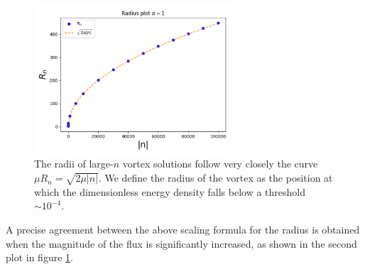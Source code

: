 \begin{figure}[h]
\begin{center}
    \includegraphics[width=2.9in]{Chapter_2_Folder_1912.11321/figures/radius_alpha1_large_n.pdf}  
   \caption{ {\small The radii of large-$n$ vortex solutions follow very closely the curve $\mu R_n=\sqrt{2\mu |n|}$.
We define the radius of the vortex as the position at which the dimensionless energy density falls below a threshold $\sim 10^{-4}$. } }\label{fig:radius}
   \end{center}
\end{figure}
A precise agreement between the above scaling formula for the radius is obtained when the magnitude of the flux is significantly increased, as shown in the second plot in figure \ref{fig:radius}.

